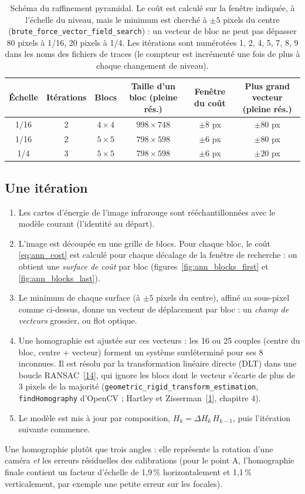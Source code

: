 \documentclass[a4paper,11pt]{report}
\begin{document}
\begin{table}[htbp]\centering
\begin{tabular}{@{}cccccc@{}}
\hline
\textbf{Échelle} & \textbf{Itérations} & \textbf{Blocs} & \textbf{Taille d'un bloc (pleine rés.)} & \textbf{Fenêtre du coût} & \textbf{Plus grand vecteur (pleine rés.)} \\ \hline
1/16 & 2 & $4 \times 4$ & $998 \times 748$ & $\pm 8$ px & $\pm 80$ px \\
1/16 & 2 & $5 \times 5$ & $798 \times 598$ & $\pm 6$ px & $\pm 80$ px \\
1/4 & 3 & $5 \times 5$ & $798 \times 598$ & $\pm 6$ px & $\pm 20$ px \\ \hline
\end{tabular}
\caption{Schéma du raffinement pyramidal. Le coût est calculé sur la fenêtre indiquée, à l'échelle du niveau, mais le minimum est cherché à $\pm 5$ pixels du centre (\texttt{brute\_force\_vector\_field\_search}) : un vecteur de bloc ne peut pas dépasser 80 pixels à 1/16, 20 pixels à 1/4. Les itérations sont numérotées 1, 2, 4, 5, 7, 8, 9 dans les noms des fichiers de traces (le compteur est incrémenté une fois de plus à chaque changement de niveau).}
\label{tab:ann_pyramid}
\end{table}

\subsection{Une itération}
\begin{enumerate}
	\item Les cartes d'énergie de l'image infrarouge sont rééchantillonnées avec le modèle courant (l'identité au départ).
	\item L'image est découpée en une grille de blocs. Pour chaque bloc, le coût \eqref{eq:ann_cost} est calculé pour chaque décalage de la fenêtre de recherche : on obtient une \emph{surface de coût} par bloc (figures~\ref{fig:ann_blocks_first} et \ref{fig:ann_blocks_last}).
	\item Le minimum de chaque surface (à $\pm 5$ pixels du centre), affiné au sous-pixel comme ci-dessus, donne un vecteur de déplacement par bloc : un \emph{champ de vecteurs} grossier, ou flot optique.
	\item Une homographie est ajustée sur ces vecteurs : les 16 ou 25 couples (centre du bloc, centre + vecteur) forment un système surdéterminé pour ses 8 inconnues. Il est résolu par la transformation linéaire directe (DLT) dans une boucle RANSAC~[\hyperref[ann_ransac]{14}], qui ignore les blocs dont le vecteur s'écarte de plus de 3 pixels de la majorité (\texttt{geometric\_rigid\_transform\_estimation}, \texttt{findHomography} d'OpenCV ; Hartley et Zisserman~[\hyperref[ann_hz]{1}], chapitre 4).
	\item Le modèle est mis à jour par composition, $H_k = \Delta H_k\, H_{k-1}$, puis l'itération suivante commence.
\end{enumerate}
Une homographie plutôt que trois angles : elle représente la rotation d'une caméra \emph{et} les erreurs résiduelles des calibrations (pour le point A, l'homographie finale contient un facteur d'échelle de 1,9\,\% horizontalement et 1,1\,\% verticalement, par exemple une petite erreur sur les focales).
\end{document}
